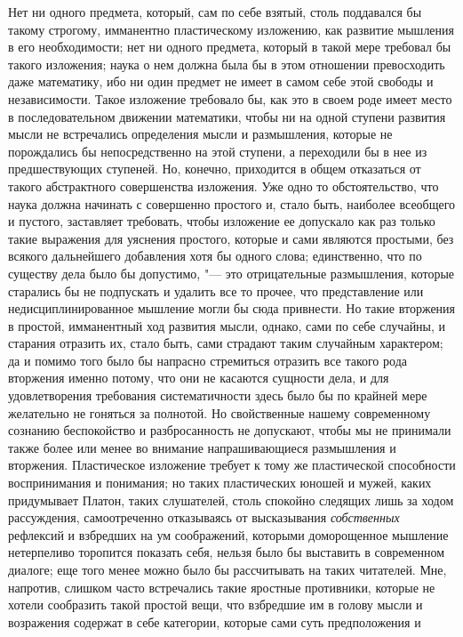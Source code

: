 Нет ни одного предмета, который, сам по себе взятый, столь поддавался бы
такому строгому, имманентно пластическому изложению, как развитие мышления
в его необходимости; нет ни одного предмета, который в такой мере требовал
бы такого изложения; наука о нем должна была бы в этом отношении
превосходить даже математику, ибо ни один предмет не имеет в самом себе
этой свободы и независимости. Такое изложение требовало бы, как это в своем
роде имеет место в последовательном движении математики, чтобы ни на одной
ступени развития мысли не встречались определения мысли и размышления,
которые не порождались бы непосредственно на этой ступени, а переходили бы
в нее из предшествующих ступеней. Но, конечно, приходится в общем
отказаться от такого абстрактного совершенства изложения. Уже одно то
обстоятельство, что наука должна начинать с совершенно простого и, стало
быть, наиболее всеобщего и пустого, заставляет требовать, чтобы изложение
ее допускало как раз только такие выражения для уяснения простого, которые
и сами являются простыми, без всякого дальнейшего добавления хотя бы одного
слова; единственно, что по существу дела было бы допустимо, "--- это
отрицательные размышления, которые старались бы не подпускать и удалить все
то прочее, что представление или недисциплинированное мышление могли бы
сюда привнести. Но такие вторжения в простой, имманентный ход развития
мысли, однако, сами по себе случайны, и старания отразить их, стало быть,
сами страдают таким случайным характером; да и помимо того было бы напрасно
стремиться отразить все такого рода вторжения именно потому, что они не
касаются сущности дела, и для удовлетворения требования систематичности
здесь было бы по крайней мере желательно не гоняться за полнотой. Но
свойственные нашему современному сознанию беспокойство и разбросанность не
допускают, чтобы мы не принимали также более или менее во внимание
напрашивающиеся размышления и вторжения. Пластическое изложение требует к
тому же пластической способности воспринимания и понимания; но таких
пластических юношей и мужей, каких придумывает Платон, таких слушателей,
столь спокойно следящих лишь за ходом рассуждения, самоотреченно
отказываясь от высказывания {\em собственных} рефлексий
и взбредших на ум соображений, которыми доморощенное мышление нетерпеливо
торопится показать себя, нельзя было бы выставить в современном диалоге;
еще того менее можно было бы рассчитывать на таких читателей. Мне,
напротив, слишком часто встречались такие яростные противники, которые не
хотели сообразить такой простой вещи, что взбредшие им в голову мысли и
возражения содержат в себе категории, которые сами суть предположения и
